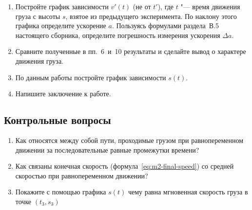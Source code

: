 \documentclass[a4paper, 12pt]{extarticle}
\begin{document}
\begin{enumerate}
\item Постройте график зависимости $v'(t)$ (не от $t'$), где $t$ "--- время движения груза с высоты $s$, взятое из предыдущего эксперимента. По наклону этого графика определите ускорение $a$. Пользуясь формулами раздела~В.5 настоящего сборника, определите погрешность измерения ускорения $\Delta a$. %
\item Сравните полученные в пп.~6~и~10 результаты и сделайте вывод о характере движения груза.
\item По данным работы постройте график зависимости $s(t)$.
\item Напишите заключение к работе.
\end{enumerate}

\subsection{Контрольные вопросы}
\begin{enumerate}
\item Как относятся между собой пути, проходимые грузом при равнопеременном движении за последовательные равные промежутки времени? 
\item Как связаны конечная скорость (формула~\eqref{eq:m2-final-speed}) со средней скоростью при равнопеременном движении?
\item Покажите с помощью графика $s(t)$ чему равна мгновенная скорость груза в точке $(t_3, s_3)$ %


\end{enumerate}
\end{document}
